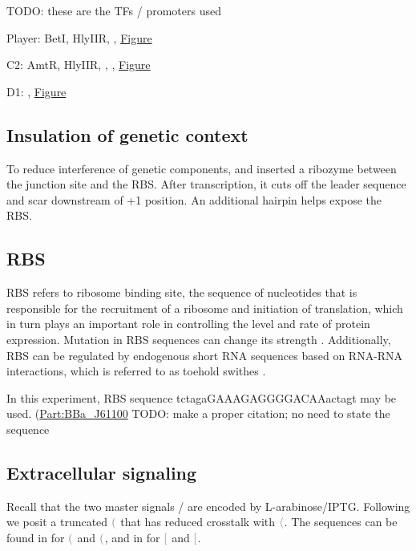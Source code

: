\documentclass[12pt,notitlepage]{article}
\let\cite\citep
\newcommand{\TODO}[1]{\textrm{\color{red}TODO: #1}}
\newcommand{\cbra}[1]{{\ensuremath{\color{gray}{#1}}}}
\newcommand{\signal}[1]{{{\cbra{\langle}\ce{#1}\cbra{\rangle}}}}
\newcommand{\protein}[1]{{{\cbra{(}\ce{#1}\cbra{)}}}}
\newcommand{\promoter}[1]{{{\cbra{[}\ce{#1}\cbra{]}}}}
\newcommand{\hh}[1]{{\color{Purple}#1}}
\begin{document}


\TODO{these are the TFs / promoters used}

Player:
BetI, HlyIIR, , 
\href{https://i.ibb.co/N2kdwJL/Screenshot-from-2021-01-21-12-06-59.png}{Figure}

C2:
AmtR, HlyIIR, , , 
\href{https://i.ibb.co/Mh2sWzg/Screenshot-from-2021-01-21-12-02-31.pngs}{Figure}

D1:
, 
\href{https://i.ibb.co/0QRf919/Screenshot-from-2021-01-21-12-04-19.png}{Figure}


\subsection{Insulation of genetic context}

To reduce interference of genetic components,
\citet{LouETAL2012} and \citet{NielsenETAL2016}
inserted a ribozyme
\hh{between the junction site and the RBS}. 
%
After transcription, 
it
\hh{cuts off the leader sequence and scar}
downstream of +1 position. 
%
An additional hairpin helps expose the RBS.


\subsection{RBS}

\hh{RBS refers to ribosome binding site, the sequence of nucleotides that is responsible for the recruitment of a ribosome and initiation of translation, which in turn plays an important role in controlling the level and rate of protein expression. 
Mutation in RBS sequences can change its strength \cite{Salis2011}. 
%
Additionally, RBS can be regulated by 
endogenous short RNA sequences based on RNA-RNA interactions, 
which is referred to as toehold swithes \cite{Green2014}.
}

\hh{In this experiment, RBS sequence  tctagaGAAAGAGGGGACAAactagt may be used.  (\href{http://parts.igem.org/wiki/index.php/Part:BBa_J61100}{Part:BBa\_J61100}
\TODO{make a proper citation; no need to state the sequence}
}


\subsection{Extracellular signaling} \label{ss:wAB}

Recall that
the two master signals /
are encoded by L-arabinose/IPTG.
%
%
Following \citet[SM, VII.M]{NielsenETAL2016}
we posit
a truncated \protein{AraC^*}
that has reduced crosstalk with \signal{IPTG}.
%
%
%
The sequences can be found 
in
\cite[SM, Table~S8]{NielsenETAL2016}
for \protein{Ara^*} and \protein{LacI},
and
in
\cite[SM, Table~S9]{NielsenETAL2016}
for \promoter{BAD} and \promoter{Tac}.
\end{document}
